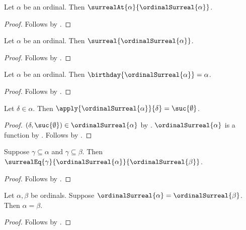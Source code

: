 \begin{proposition}\label{ordinal_surreal_at}
    Let $\alpha$ be an ordinal.
    Then $\surrealAt{\alpha}{\ordinalSurreal{\alpha}}$.
\end{proposition}
\begin{proof}
    Follows by .
\end{proof}

\begin{proposition}\label{ordinal_surreal_is_surreal}
    Let $\alpha$ be an ordinal.
    Then $\surreal{\ordinalSurreal{\alpha}}$.
\end{proposition}
\begin{proof}
    Follows by .
\end{proof}

\begin{proposition}\label{ordinal_surreal_birthday}
    Let $\alpha$ be an ordinal.
    Then $\birthday{\ordinalSurreal{\alpha}}=\alpha$.
\end{proposition}
\begin{proof}
    Follows by .
\end{proof}

\begin{proposition}\label{ordinal_surreal_value}
    Let $\delta\in\alpha$.
    Then $\apply{\ordinalSurreal{\alpha}}{\delta}=\suc{\emptyset}$.
\end{proposition}
\begin{proof}
    $(\delta,\suc{\emptyset})\in\ordinalSurreal{\alpha}$
        by .
    $\ordinalSurreal{\alpha}$ is a function
        by .
    Follows by .
\end{proof}

\begin{proposition}\label{ordinal_surreal_agree}
    Suppose $\gamma\subseteq\alpha$ and $\gamma\subseteq\beta$.
    Then $\surrealEq{\gamma}
        {\ordinalSurreal{\alpha}}{\ordinalSurreal{\beta}}$.
\end{proposition}
\begin{proof}
    Follows by
        .
\end{proof}

\begin{proposition}\label{ordinal_surreal_injective}
    Let $\alpha,\beta$ be ordinals.
    Suppose $\ordinalSurreal{\alpha}=\ordinalSurreal{\beta}$.
    Then $\alpha=\beta$.
\end{proposition}
\begin{proof}
    Follows by .
\end{proof}

